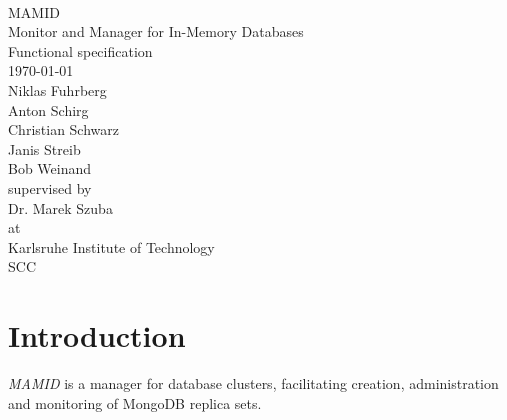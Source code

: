 \documentclass[a4paper, 11pt]{article}
\begin{document}
\newcommand{\refsymbol}[0]{\scalebox{0.5}{$\nearrow$}}
\let\oldref\ref
\renewcommand{\ref}[1]{\refsymbol\oldref{#1}}
\let\oldgls\gls
\renewcommand{\gls}[1]{\refsymbol\oldgls{#1}}
\let\oldGls\Gls
\renewcommand{\Gls}[1]{\refsymbol\oldGls{#1}}
\let\oldglspl\glspl
\renewcommand{\glspl}[1]{\refsymbol\oldglspl{#1}}
\let\oldGlspl\Glspl
\renewcommand{\Glspl}[1]{\refsymbol\oldGlspl{#1}}
\let\oldglslink\glslink
\renewcommand{\glslink}[2]{\refsymbol\oldglslink{#1}{#2}}
\let\oldhyperref\hyperref
\renewcommand{\hyperref}[2][notActuallyOptional]{\refsymbol\oldhyperref[#1]{#2}}
\let\oldautoref\autoref
\renewcommand{\autoref}[1]{\refsymbol\oldautoref{#1}}

\newcommand{\abbildung}[1]{\autoref{fig:#1}}
\newcommand{\mamid}{\textit{MAMID}\xspace}



\begin{titlepage}
\makeatletter
\begin{center}
~\\[4em]
{\Huge MAMID}\\[.8em]\huge{Monitor and Manager for In-Memory Databases}\\[2em]
{\huge Functional specification}\\[1em]
{\large\today}\\[2.5em]
{\LARGE
Niklas Fuhrberg\\
Anton Schirg\\
Christian Schwarz\\
Janis Streib\\
Bob Weinand\\[3em]}
supervised by\\[2em]
{\Large
Dr. Marek Szuba\\[1em]}
at\\[1em]
{\Large
Karlsruhe Institute of Technology\\
SCC}

\end{center}
\makeatother
\end{titlepage}
\newpage
\tableofcontents
\newpage

\section{Introduction}
\mamid is a manager for database \glspl{cluster}, facilitating creation, administration and monitoring of \gls{MongoDB} \glspl{replica set}.
\end{document}
